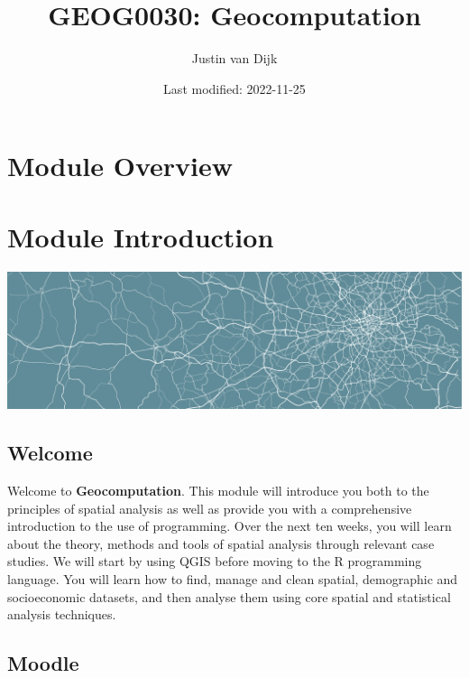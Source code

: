 \documentclass[
]{book}
\title{GEOG0030: Geocomputation}
\author{Justin van Dijk}
\date{Last modified: 2022-11-25}
\begin{document}
\maketitle

{
\setcounter{tocdepth}{1}
\tableofcontents
}
\hypertarget{module-overview}{%
\chapter*{Module Overview}\label{module-overview}}

\hypertarget{module-introduction}{%
\chapter*{Module Introduction}\label{module-introduction}}

\begin{center}\includegraphics[width=1\linewidth]{images/general/geocomputation_welcome} \end{center}

\hypertarget{welcome}{%
\section*{Welcome}\label{welcome}}

Welcome to \textbf{Geocomputation}. This module will introduce you both to the principles of spatial analysis as well as provide you with a comprehensive introduction to the use of programming. Over the next ten weeks, you will learn about the theory, methods and tools of spatial analysis through relevant case studies. We will start by using QGIS before moving to the R programming language. You will learn how to find, manage and clean spatial, demographic and socioeconomic datasets, and then analyse them using core spatial and statistical analysis techniques.

\hypertarget{moodle}{%
\section*{Moodle}\label{moodle}}
\end{document}

